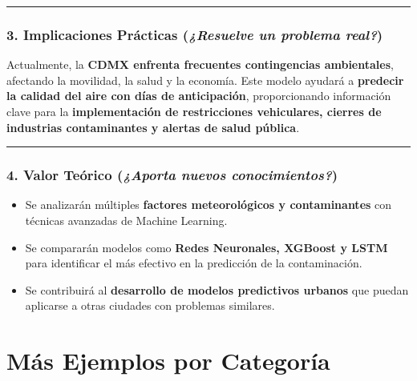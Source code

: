 \documentclass[
  letterpaper,
  DIV=11,
  numbers=noendperiod]{scrartcl}
\providecommand{\tightlist}{%
  \setlength{\itemsep}{0pt}\setlength{\parskip}{0pt}}
\begin{document}
\begin{center}\rule{0.5\linewidth}{0.5pt}\end{center}

\subsubsection{\texorpdfstring{\textbf{3. Implicaciones Prácticas}
(\emph{¿Resuelve un problema
real?})}{3. Implicaciones Prácticas (¿Resuelve un problema real?)}}\label{implicaciones-pruxe1cticas-resuelve-un-problema-real}

Actualmente, la \textbf{CDMX enfrenta frecuentes contingencias
ambientales}, afectando la movilidad, la salud y la economía. Este
modelo ayudará a \textbf{predecir la calidad del aire con días de
anticipación}, proporcionando información clave para la
\textbf{implementación de restricciones vehiculares, cierres de
industrias contaminantes y alertas de salud pública}.

\begin{center}\rule{0.5\linewidth}{0.5pt}\end{center}

\subsubsection{\texorpdfstring{\textbf{4. Valor Teórico} (\emph{¿Aporta
nuevos
conocimientos?})}{4. Valor Teórico (¿Aporta nuevos conocimientos?)}}\label{valor-teuxf3rico-aporta-nuevos-conocimientos}

\begin{itemize}
\tightlist
\item
  Se analizarán múltiples \textbf{factores meteorológicos y
  contaminantes} con técnicas avanzadas de Machine Learning.\\
\item
  Se compararán modelos como \textbf{Redes Neuronales, XGBoost y LSTM}
  para identificar el más efectivo en la predicción de la
  contaminación.\\
\item
  Se contribuirá al \textbf{desarrollo de modelos predictivos urbanos}
  que puedan aplicarse a otras ciudades con problemas similares.
\end{itemize}

\section{Más Ejemplos por
Categoría}\label{muxe1s-ejemplos-por-categoruxeda}
\end{document}

